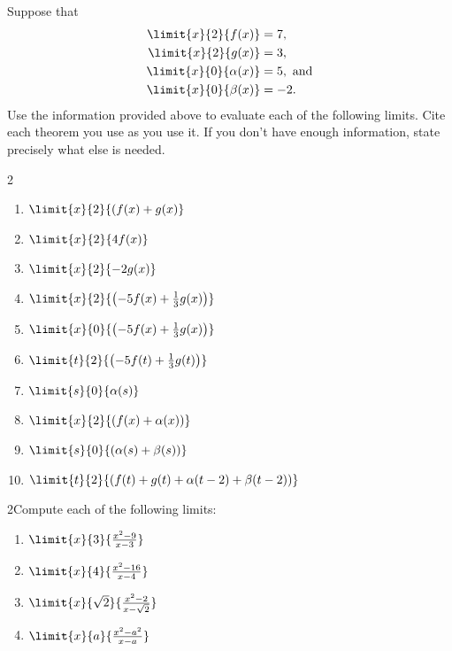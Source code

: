   \begin{embeddedproblem}{}
    Suppose that
    \begin{align*}
      \limit{x}{2}{f(x)}&=7, \\
      \limit{x}{2}{g(x)}&=3, \\
      \limit{x}{0}{\alpha(x)}&=5, \text{ and} \\
      \limit{x}{0}{\beta(x)}&=-2.
    \end{align*}
    Use the information provided above to evaluate each of the
    following limits. Cite each theorem you use as you use it. If you
    don't have enough information, state precisely what else is
    needed.
    \begin{multicols}{2}
      \begin{enumerate}[label={\bf{}(\alph*)}]
      \item $\limit{x}{2}{(f(x)+g(x)}$
      \item $\limit{x}{2}{4f(x)}$
      \item $\limit{x}{2}{-2g(x)}$
      \item $\limit{x}{2}{\left(-5f(x)+\frac13g(x)\right)}$
      \item $\limit{x}{0}{\left(-5f(x)+\frac13g(x)\right)}$
      \item $\limit{t}{2}{\left(-5f(t)+\frac13g(t)\right)}$
      \item $\limit{s}{0}{\alpha(s)}$
      \item $\limit{x}{2}{\left(f(x)+\alpha(x)\right)}$
      \item $\limit{s}{0}{\left(\alpha(s)+\beta(s)\right)}$
      \item $\limit{t}{2}{\left(f(t)+g(t)+\alpha(t-2)+\beta(t-2)\right)}$
      \end{enumerate}
    \end{multicols}
  \end{embeddedproblem}
  \begin{embeddedproblem}{}
    \begin{multicols}{2}{Compute each of the following limits:}
      \begin{enumerate}[label={\bf{}(\alph*)}]
        \item $\limit{x}{3}{\frac{x^2-9}{x-3}}$
        \item $\limit{x}{4}{\frac{x^2-16}{x-4}}$
        \item $\limit{x}{\sqrt{2}}{\frac{x^2-2}{x-\sqrt{2}}}$
        \item $\limit{x}{a}{\frac{x^2-a^2}{x-a}}$
        \end{enumerate}
      \end{multicols}
    \end{embeddedproblem}
    
